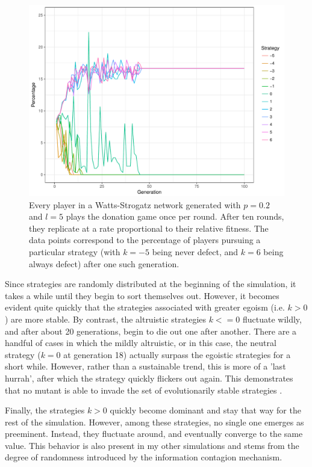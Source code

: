 \documentclass{JASSS}
\begin{document}
\begin{figure}
	\centering
	\includegraphics[width=\linewidth]{./figures/results_WS_300_p02.pdf}
	\caption{Every player in a Watts-Strogatz network generated with $p=0.2$ and $l=5$ plays the donation game once per round. After ten rounds, they replicate at a rate proportional to their relative fitness. The data points correspond to the percentage of players pursuing a particular strategy (with $k=-5$ being never defect, and $k=6$ being always defect) after one such generation.}
	\label{WS_300_p_03}
\end{figure}

Since strategies are randomly distributed at the beginning of the simulation, it takes a while until they begin to sort themselves out. However, it becomes evident quite quickly that the strategies associated with greater egoism (i.e. $k>0$) are more stable. By contrast, the altruistic strategies $k<=0$ fluctuate wildly, and after about 20 generations, begin to die out one after another. There are a handful of cases in which the mildly altruistic, or in this case, the neutral strategy ($k=0$ at generation 18) actually surpass the egoistic strategies for a short while. However, rather than a sustainable trend, this is more of a 'last hurrah', after which the strategy quickly flickers out again. This demonstrates that no mutant is able to invade the set of evolutionarily stable strategies \citep{hamilton1964_2}.

Finally, the strategies $k>0$ quickly become dominant and stay that way for the rest of the simulation. However, among these strategies, no single one emerges as preeminent. Instead, they fluctuate around, and eventually converge to the same value. This behavior is also present in my other simulations and stems from the degree of randomness introduced by the information contagion mechanism.
\end{document}
